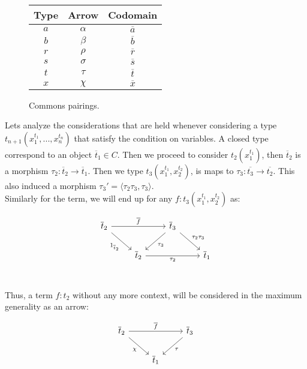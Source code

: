 \begin{definition}
\begin{remark}
  \begin{figure}[!h]
    \begin{center}
      \begin{tabular}{|c|c|c|}
        \toprule
        Type & Arrow & Codomain \\
        \midrule
        $a$ & $\alpha$ & $\overline a$\\
        $b$ & $\beta$ & $\overline b$\\
        $r$ & $\rho$ & $\overline r$\\
        $s$ & $\sigma$ & $\overline s$\\
        $t$ & $\tau$ & $\overline t$\\
        $x$ & $\chi$ & $\overline x$\\
        \bottomrule
      \end{tabular}
    \end{center}
    \caption{Commons pairings.} \label{faketable:mul}

  \end{figure}

\end{remark}

\begin{remark}\label{multiple-def}
  Lets analyze the considerations that are held whenever considering a type $t_{n+1}(x_1^{t_1},...,x_n^{t_n})$ that satisfy the condition on variables.  A closed type correspond to an object $\overline t_1\in C$. Then we proceed to consider $t_2(x_1^{t_1})$, then $\overline t_2$ is a morphism $\tau_2:\overline t_2\to \overline t_1$. Then we type $t_{3}(x_1^{t_1}, x_2^{t_2})$, is maps to $\tau_3: \overline{t_3}\to \overline{t_2}$. This also induced a morphism $\tau_3' = \langle \tau_2\tau_3, \tau_3\rangle$.\\

  Similarly for the term, we will end up for any $f:t_3(x_1^{t_1}, x_2^{t_2})$ as:
  \[
    \begin{tikzpicture}
      \node {\begin{tikzcd}
          \overline t_2 \ar[rr,"\overline f"]\ar[rd,swap, "1_{\overline t_2}"] &  & \overline t_3 \ar[ld, "\tau_3"]\ar[rd, "\tau_2\tau_3"]  \\
          &   \overline t_2\ar[rr, swap, "\tau_2"] & & \overline t_1\\
        \end{tikzcd}};
    \end{tikzpicture}
  \]

  Thus, a term $f:t_2$ without any more context, will be considered in the maximum generality as an arrow:
  \[
    \begin{tikzpicture}
      \node {\begin{tikzcd}
          \overline t_2 \ar[rr,"\overline f"]\ar[rd,swap, "\chi"] &  & \overline t_3 \ar[ld, "\tau"]  \\
          &   \overline t_1 & \\
        \end{tikzcd}};
    \end{tikzpicture}
  \]
  

\end{remark}
\end{definition}
